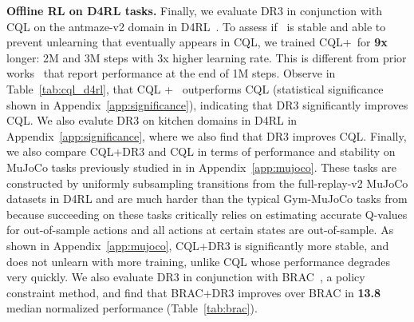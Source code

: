 \textbf{{Offline RL on D4RL tasks.}} Finally, we evaluate DR3 in conjunction with CQL on the antmaze-v2 domain in D4RL~\citep{fu2020d4rl}. To assess if \drmethodname\ is stable and able to prevent unlearning that eventually appears in CQL, we trained CQL+\drmethodname\ for \textbf{9x} longer: 2M and 3M steps with 3x higher learning rate. This is different from prior works~\citep{fu2020d4rl} that report performance at the end of 1M steps.
Observe in Table~\ref{tab:cql_d4rl}, that CQL + \drmethodname\ outperforms CQL ({statistical significance shown in Appendix~\ref{app:significance}}), indicating that DR3 significantly improves CQL. We also evalute DR3 on kitchen domains in D4RL in Appendix~\ref{app:significance}, where we also find that DR3 improves CQL. Finally, we also compare CQL+DR3 and CQL in terms of performance and stability on MuJoCo tasks previously studied in \citet{kumar2021implicit} in Appendix~\ref{app:mujoco}. These tasks are constructed by uniformly subsampling transitions from the full-replay-v2 MuJoCo datasets in D4RL and are much harder than the typical Gym-MuJoCo tasks from \citet{fu2020d4rl} because succeeding on these tasks critically relies on estimating accurate Q-values for out-of-sample actions and all actions at certain states are out-of-sample. As shown in Appendix~\ref{app:mujoco}, CQL+DR3 is significantly more stable, and does not unlearn with more training, unlike CQL whose performance degrades very quickly. We also evaluate DR3 in conjunction with BRAC~\citep{wu2019behavior}, a policy constraint method, and find that BRAC+DR3 improves over BRAC in \textbf{13.8} median normalized performance (Table~\ref{tab:brac}).

